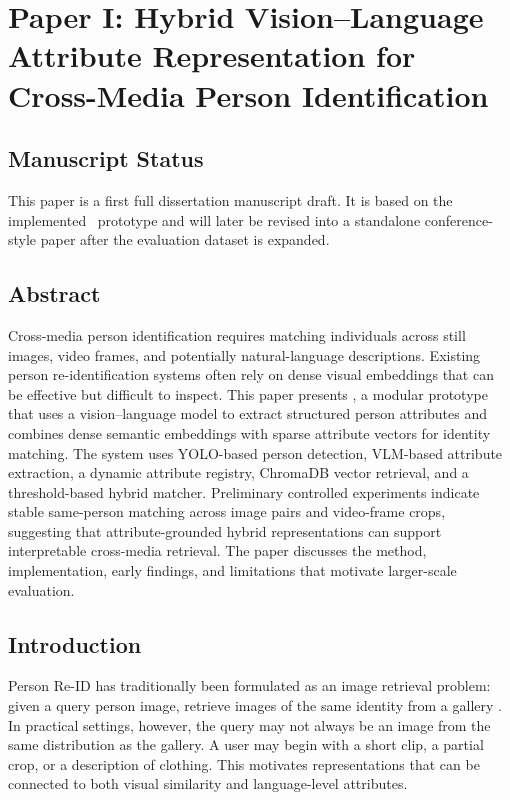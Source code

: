 \chapter[Paper I: Hybrid VLM-Based Person Identification]{Paper I: Hybrid Vision--Language Attribute Representation for Cross-Media Person Identification}
\label{paper:hybrid-vlm-pid}

\section*{Manuscript Status}

This paper is a first full dissertation manuscript draft. It is based on the implemented \systemname\ prototype and will later be revised into a standalone conference-style paper after the evaluation dataset is expanded.

\section{Abstract}

Cross-media person identification requires matching individuals across still images, video frames, and potentially natural-language descriptions. Existing person re-identification systems often rely on dense visual embeddings that can be effective but difficult to inspect. This paper presents \systemname, a modular prototype that uses a vision--language model to extract structured person attributes and combines dense semantic embeddings with sparse attribute vectors for identity matching. The system uses YOLO-based person detection, VLM-based attribute extraction, a dynamic attribute registry, ChromaDB vector retrieval, and a threshold-based hybrid matcher. Preliminary controlled experiments indicate stable same-person matching across image pairs and video-frame crops, suggesting that attribute-grounded hybrid representations can support interpretable cross-media retrieval. The paper discusses the method, implementation, early findings, and limitations that motivate larger-scale evaluation.

\section{Introduction}

Person Re-ID has traditionally been formulated as an image retrieval problem: given a query person image, retrieve images of the same identity from a gallery \citep{zheng2016person,ye2021deep}. In practical settings, however, the query may not always be an image from the same distribution as the gallery. A user may begin with a short clip, a partial crop, or a description of clothing. This motivates representations that can be connected to both visual similarity and language-level attributes.

